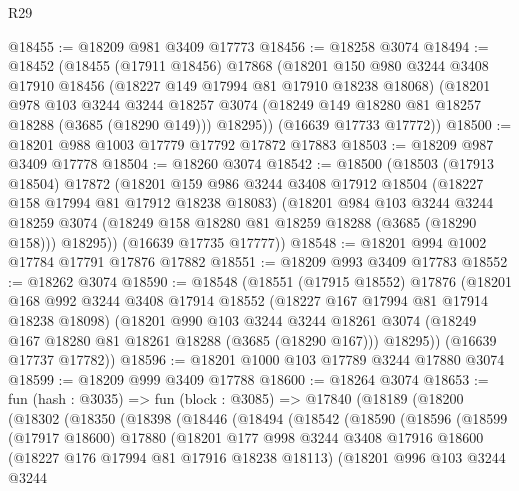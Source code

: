 \begin{lexlean}{R29}
\begin{coremodule}
@18455 := @18209 @981 @3409 @17773
@18456 := @18258 @3074
@18494 := @18452
    (@18455
      (@17911 @18456)
      @17868
      (@18201
        @150
        @980
        @3244
        @3408
        @17910
        @18456
        (@18227 @149 @17994 @81 @17910 @18238 @18068)
        (@18201
          @978
          @103
          @3244
          @3244
          @18257
          @3074
          (@18249 @149 @18280 @81 @18257 @18288 (@3685 (@18290 @149)))
          @18295))
      (@16639 @17733 @17772))
@18500 := @18201 @988 @1003 @17779 @17792 @17872 @17883
@18503 := @18209 @987 @3409 @17778
@18504 := @18260 @3074
@18542 := @18500
    (@18503
      (@17913 @18504)
      @17872
      (@18201
        @159
        @986
        @3244
        @3408
        @17912
        @18504
        (@18227 @158 @17994 @81 @17912 @18238 @18083)
        (@18201
          @984
          @103
          @3244
          @3244
          @18259
          @3074
          (@18249 @158 @18280 @81 @18259 @18288 (@3685 (@18290 @158)))
          @18295))
      (@16639 @17735 @17777))
@18548 := @18201 @994 @1002 @17784 @17791 @17876 @17882
@18551 := @18209 @993 @3409 @17783
@18552 := @18262 @3074
@18590 := @18548
    (@18551
      (@17915 @18552)
      @17876
      (@18201
        @168
        @992
        @3244
        @3408
        @17914
        @18552
        (@18227 @167 @17994 @81 @17914 @18238 @18098)
        (@18201
          @990
          @103
          @3244
          @3244
          @18261
          @3074
          (@18249 @167 @18280 @81 @18261 @18288 (@3685 (@18290 @167)))
          @18295))
      (@16639 @17737 @17782))
@18596 := @18201 @1000 @103 @17789 @3244 @17880 @3074
@18599 := @18209 @999 @3409 @17788
@18600 := @18264 @3074
@18653 := fun (hash : @3035) =>
  fun (block : @3085) =>
  @17840
    (@18189
      (@18200
        (@18302
          (@18350
            (@18398
              (@18446
                (@18494
                  (@18542
                    (@18590
                      (@18596
                        (@18599
                          (@17917 @18600)
                          @17880
                          (@18201
                            @177
                            @998
                            @3244
                            @3408
                            @17916
                            @18600
                            (@18227 @176 @17994 @81 @17916 @18238 @18113)
                            (@18201
                              @996
                              @103
                              @3244
                              @3244

\end{coremodule}
\end{lexlean}

